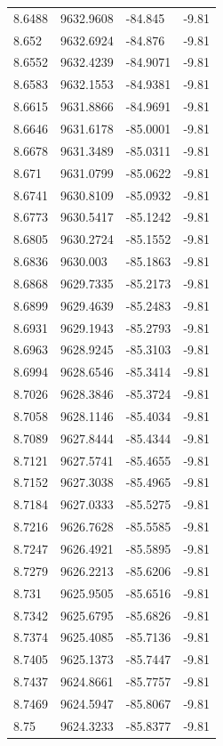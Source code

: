 \begin{table}[H]
\begin{tabular}{llll}
8.6488 & 9632.9608 & -84.845 & -9.81 \\
8.652 & 9632.6924 & -84.876 & -9.81 \\
8.6552 & 9632.4239 & -84.9071 & -9.81 \\
8.6583 & 9632.1553 & -84.9381 & -9.81 \\
8.6615 & 9631.8866 & -84.9691 & -9.81 \\
8.6646 & 9631.6178 & -85.0001 & -9.81 \\
8.6678 & 9631.3489 & -85.0311 & -9.81 \\
8.671 & 9631.0799 & -85.0622 & -9.81 \\
8.6741 & 9630.8109 & -85.0932 & -9.81 \\
8.6773 & 9630.5417 & -85.1242 & -9.81 \\
8.6805 & 9630.2724 & -85.1552 & -9.81 \\
8.6836 & 9630.003 & -85.1863 & -9.81 \\
8.6868 & 9629.7335 & -85.2173 & -9.81 \\
8.6899 & 9629.4639 & -85.2483 & -9.81 \\
8.6931 & 9629.1943 & -85.2793 & -9.81 \\
8.6963 & 9628.9245 & -85.3103 & -9.81 \\
8.6994 & 9628.6546 & -85.3414 & -9.81 \\
8.7026 & 9628.3846 & -85.3724 & -9.81 \\
8.7058 & 9628.1146 & -85.4034 & -9.81 \\
8.7089 & 9627.8444 & -85.4344 & -9.81 \\
8.7121 & 9627.5741 & -85.4655 & -9.81 \\
8.7152 & 9627.3038 & -85.4965 & -9.81 \\
8.7184 & 9627.0333 & -85.5275 & -9.81 \\
8.7216 & 9626.7628 & -85.5585 & -9.81 \\
8.7247 & 9626.4921 & -85.5895 & -9.81 \\
8.7279 & 9626.2213 & -85.6206 & -9.81 \\
8.731 & 9625.9505 & -85.6516 & -9.81 \\
8.7342 & 9625.6795 & -85.6826 & -9.81 \\
8.7374 & 9625.4085 & -85.7136 & -9.81 \\
8.7405 & 9625.1373 & -85.7447 & -9.81 \\
8.7437 & 9624.8661 & -85.7757 & -9.81 \\
8.7469 & 9624.5947 & -85.8067 & -9.81 \\
8.75 & 9624.3233 & -85.8377 & -9.81 \\

\end{tabular}
\end{table}
